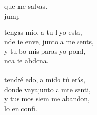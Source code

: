 \begin{cancion}
	 que  me salvas.  \\jump\\
	\begin{chorus}%
	 tengas mio, a tu l yo esta,\\
	nde te enve, junto a me sents, \\
	y  tu bo mis paras yo pond,\\
	nca te abdona.\\
	\jump\\
	 tendré edo, a mido tú erás,\\
	donde vayajunto a mte senti,\\
	y  tus mos siem me abandon, \\
	lo en  confi. \\
	\end{chorus}%
	\jump\\
\end{cancion}%
